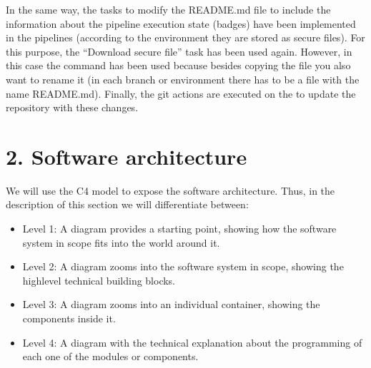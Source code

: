 \documentclass[letterpaper,10pt,english]{sphinxmanual}
\begin{document}
In the same way, the tasks to modify the README.md file to include the information about the pipeline execution state (badges) have been implemented in the pipelines (according to the environment they are stored as secure files). For this purpose, the “Download secure file” task has been used again. However, in this case the   command has been used because besides copying the file you also want to rename it (in each branch or environment there has to be a file with the name README.md). Finally, the git actions are executed on the  to update the repository with these changes.




\chapter{2. Software architecture}
\label{\detokenize{pages/Software architecture:software-architecture}}\label{\detokenize{pages/Software architecture::doc}}
We will use the C4 model to expose the software architecture. Thus, in the description of this section we will differentiate between:
\begin{itemize}
\item {} 
Level 1: A  diagram provides a starting point, showing how the software system in scope fits into the world around it.

\item {} 
Level 2: A  diagram zooms into the software system in scope, showing the high\sphinxhyphen{}level technical building blocks.

\item {} 
Level 3: A  diagram zooms into an individual container, showing the components inside it.

\item {} 
Level 4: A  diagram with the technical explanation about the programming of each one of the modules or components.

\end{itemize}
\end{document}
